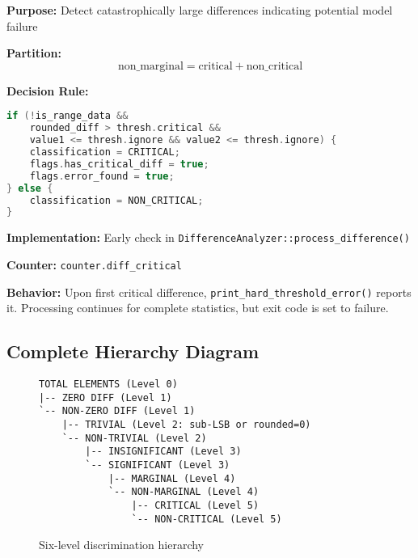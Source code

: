 \textbf{Purpose:} Detect catastrophically large differences indicating potential model failure

\textbf{Partition:}
\begin{equation}
    \text{non\_marginal} = \text{critical} + \text{non\_critical}
\end{equation}

\textbf{Decision Rule:}
\begin{lstlisting}[language=C++]
if (!is_range_data &&
    rounded_diff > thresh.critical &&
    value1 <= thresh.ignore && value2 <= thresh.ignore) {
    classification = CRITICAL;
    flags.has_critical_diff = true;
    flags.error_found = true;
} else {
    classification = NON_CRITICAL;
}
\end{lstlisting}

\textbf{Implementation:} Early check in \texttt{DifferenceAnalyzer::process\_difference()}

\textbf{Counter:} \texttt{counter.diff\_critical}

\textbf{Behavior:} Upon first critical difference, \texttt{print\_hard\_threshold\_error()} reports it. Processing continues for complete statistics, but exit code is set to failure.

\subsection{Complete Hierarchy Diagram}

\begin{figure}[h]
\centering
\small
\begin{verbatim}
TOTAL ELEMENTS (Level 0)
|-- ZERO DIFF (Level 1)
`-- NON-ZERO DIFF (Level 1)
    |-- TRIVIAL (Level 2: sub-LSB or rounded=0)
    `-- NON-TRIVIAL (Level 2)
        |-- INSIGNIFICANT (Level 3)
        `-- SIGNIFICANT (Level 3)
            |-- MARGINAL (Level 4)
            `-- NON-MARGINAL (Level 4)
                |-- CRITICAL (Level 5)
                `-- NON-CRITICAL (Level 5)
\end{verbatim}
\caption{Six-level discrimination hierarchy}
\label{fig:hierarchy}
\end{figure}
